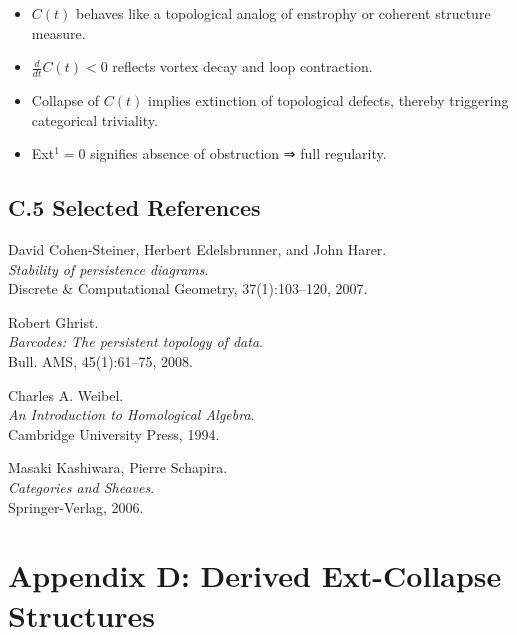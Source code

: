 \documentclass[11pt]{article}
\begin{document}
\begin{itemize}
  \item $C(t)$ behaves like a topological analog of enstrophy or coherent structure measure.
  \item $\frac{d}{dt} C(t) < 0$ reflects vortex decay and loop contraction.
  \item Collapse of $C(t)$ implies extinction of topological defects, thereby triggering categorical triviality.
  \item Ext$^1 = 0$ signifies absence of obstruction ⇒ full regularity.
\end{itemize}

\subsection*{C.5 Selected References}

\begin{thebibliography}{9}

David Cohen-Steiner, Herbert Edelsbrunner, and John Harer.\\
\textit{Stability of persistence diagrams}.\\
Discrete \& Computational Geometry, 37(1):103--120, 2007.

Robert Ghrist.\\
\textit{Barcodes: The persistent topology of data}.\\
Bull. AMS, 45(1):61--75, 2008.

Charles A. Weibel.\\
\textit{An Introduction to Homological Algebra}.\\
Cambridge University Press, 1994.

Masaki Kashiwara, Pierre Schapira.\\
\textit{Categories and Sheaves}.\\
Springer-Verlag, 2006.

\end{thebibliography}



\section*{Appendix D: Derived Ext-Collapse Structures}
\end{document}
